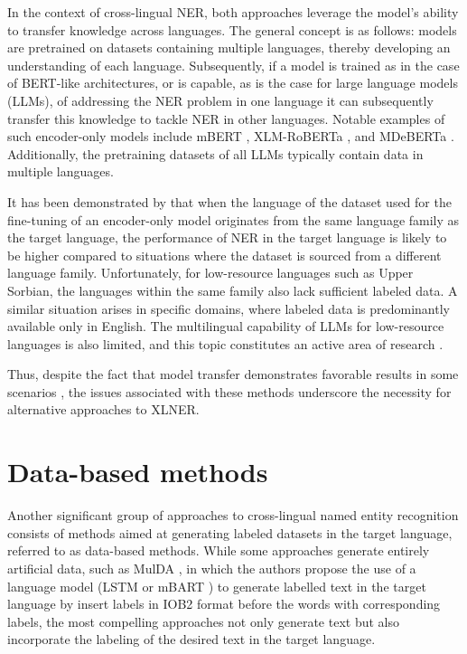 In the context of cross-lingual NER, both approaches leverage the model's ability to transfer knowledge
across languages. The general concept is as follows: models are pretrained on datasets containing
multiple languages, thereby developing an understanding of each language. Subsequently, if a model
is trained as in the case of BERT-like architectures, or is capable, as is the case for large language models (LLMs),
of addressing the NER problem in one language it can subsequently transfer this knowledge to tackle
NER in other languages. Notable examples of such encoder-only models include mBERT
\cite{devlin-etal-2019-bert}, XLM-RoBERTa \cite{conneau-etal-2020-unsupervised-xlmr}, and
MDeBERTa \cite{He2020DeBERTaDB,He2021DeBERTaV3ID}. Additionally, the pretraining datasets
of all LLMs typically contain data in multiple languages.

It has been demonstrated by \cite{torge-etal-2023-named} that when the language of the dataset used for the
fine-tuning of an encoder-only model originates from the same language family as the target
language, the performance of NER in the target language is likely to be higher compared to situations
where the dataset is sourced from a different language family. Unfortunately, for low-resource
languages such as Upper Sorbian, the languages within the same family also lack sufficient labeled data.
A similar situation arises in specific domains, where labeled data is predominantly available only in English.
The multilingual capability of LLMs for low-resource languages is also limited,
and this topic constitutes an active area of research \cite{lai-etal-2024-llms}.

Thus, despite the fact that model transfer demonstrates favorable results in some
scenarios \cite{garcia-ferrero-etal-2022-model}, the issues associated with these methods
underscore the necessity for alternative approaches to XLNER.

\section{Data-based methods}

Another significant group of approaches to cross-lingual named entity recognition consists of methods
aimed at generating labeled datasets in the target language, referred to as data-based methods.
While some approaches generate entirely artificial data, such as MulDA \cite{liu-etal-2021-mulda},
in which the authors propose the use of a language model (LSTM \cite{lstm} or
mBART \cite{liu-etal-2020-multilingual-denoising}) to generate labelled text in the target language by
insert labels in IOB2 format before the words with corresponding labels, the most compelling approaches
not only generate text but also incorporate the labeling of the desired text in the target language.

